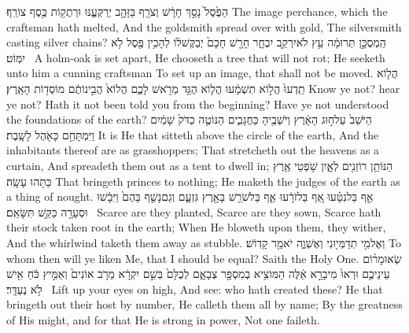 {הַפֶּ֙סֶל֙ נָסַ֣ךְ חָרָ֔שׁ וְצֹרֵ֖ף בַּזָּהָ֣ב יְרַקְּעֶ֑נּוּ וּרְתֻק֥וֹת כֶּ֖סֶף צוֹרֵֽף׃}
{The image perchance, which the craftsman hath melted, And the goldsmith spread over with gold, The silversmith casting silver chains?}
{הַֽמְסֻכָּ֣ן תְּרוּמָ֔ה עֵ֥ץ לֹא\maqqaf יִרְקַ֖ב יִבְחָ֑ר חָרָ֤שׁ חָכָם֙ יְבַקֶּשׁ\maqqaf ל֔וֹ לְהָכִ֥ין פֶּ֖סֶל לֹ֥א יִמּֽוֹט׃ \setuma }
{A holm-oak is set apart, He chooseth a tree that will not rot; He seeketh unto him a cunning craftsman To set up an image, that shall not be moved.}
{הֲל֤וֹא תֵֽדְעוּ֙ הֲל֣וֹא תִשְׁמָ֔עוּ הֲל֛וֹא הֻגַּ֥ד מֵרֹ֖אשׁ לָכֶ֑ם הֲלוֹא֙ הֲבִ֣ינוֹתֶ֔ם מוֹסְד֖וֹת הָאָֽרֶץ׃}
{Know ye not? hear ye not? Hath it not been told you from the beginning? Have ye not understood the foundations of the earth?}
{הַיֹּשֵׁב֙ עַל\maqqaf ח֣וּג הָאָ֔רֶץ וְיֹשְׁבֶ֖יהָ כַּחֲגָבִ֑ים הַנּוֹטֶ֤ה כַדֹּק֙ שָׁמַ֔יִם וַיִּמְתָּחֵ֥ם כָּאֹ֖הֶל לָשָֽׁבֶת׃}
{It is He that sitteth above the circle of the earth, And the inhabitants thereof are as grasshoppers; That stretcheth out the heavens as a curtain, And spreadeth them out as a tent to dwell in;}
{הַנּוֹתֵ֥ן רוֹזְנִ֖ים לְאָ֑יִן שֹׁ֥פְטֵי אֶ֖רֶץ כַּתֹּ֥הוּ עָשָֽׂה׃}
{That bringeth princes to nothing; He maketh the judges of the earth as a thing of nought.}
{אַ֣ף בַּל\maqqaf נִטָּ֗עוּ אַ֚ף בַּל\maqqaf זֹרָ֔עוּ אַ֛ף בַּל\maqqaf שֹׁרֵ֥שׁ בָּאָ֖רֶץ גִּזְעָ֑ם וְגַם\maqqaf נָשַׁ֤ף בָּהֶם֙ וַיִּבָ֔שׁוּ וּסְעָרָ֖ה כַּקַּ֥שׁ תִּשָּׂאֵֽם׃ \setuma }
{Scarce are they planted, Scarce are they sown, Scarce hath their stock taken root in the earth; When He bloweth upon them, they wither, And the whirlwind taketh them away as stubble.}
{וְאֶל\maqqaf מִ֥י תְדַמְּי֖וּנִי וְאֶשְׁוֶ֑ה יֹאמַ֖ר קָדֽוֹשׁ׃}
{To whom then will ye liken Me, that I should be equal? Saith the Holy One.}
{שְׂאוּ\maqqaf מָר֨וֹם עֵינֵיכֶ֤ם וּרְאוּ֙ מִי\maqqaf בָרָ֣א אֵ֔לֶּה הַמּוֹצִ֥יא בְמִסְפָּ֖ר צְבָאָ֑ם לְכֻלָּם֙ בְּשֵׁ֣ם יִקְרָ֔א מֵרֹ֤ב אוֹנִים֙ וְאַמִּ֣יץ כֹּ֔חַ אִ֖ישׁ לֹ֥א נֶעְדָּֽר׃ \setuma }
{Lift up your eyes on high, And see: who hath created these? He that bringeth out their host by number, He calleth them all by name; By the greatness of His might, and for that He is strong in power, Not one faileth.}
\label{haft_46}
\setcounter{chap}{49}
\setcounter{verse}{14}
